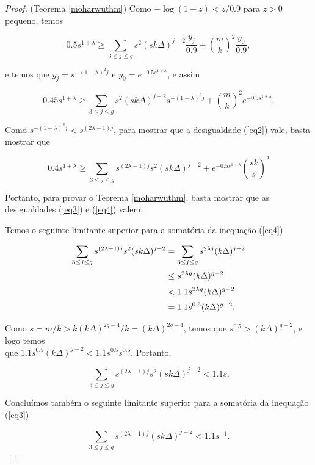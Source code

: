 \begin{proof}{(Teorema \ref{moharwuthm})}
Como $-\log(1-z) < z/0.9$ para $z>0$ pequeno, temos

\[0.5s^{1+\lambda} \geq \sum_{3\leq j \leq g} s^2(sk\Delta)^{j-2}\frac{y_j}{0.9} + \binom{m}{k}^2\frac{y_0}{0.9},\]

e temos que $y_j = s^{-(1-\lambda)^2j}$ e $y_0 = e^{-0.5s^{1+\lambda}}$, e assim

\[0.45s^{1+\lambda} \geq \sum_{3\leq j \leq g} s^2(sk\Delta)^{j-2} s^{-(1-\lambda)^2j} + \binom{m}{k}^2e^{-0.5s^{1+\lambda}}.\]

Como $s^{-(1-\lambda)^2j} < s^{(2\lambda - 1)j}$, para mostrar que a desigualdade (\ref{eq2}) vale, basta mostrar que

\begin{equation}\label{eq4}
0.4s^{1+\lambda} \geq \sum_{3\leq j\leq g}s^{(2\lambda-1)j}s^2(sk\Delta)^{j-2}+e^{-0.5s^{1+\lambda}}\binom{sk}{s}^2
\end{equation}

Portanto, para provar o Teorema \ref{moharwuthm}, basta mostrar que as desigualdades (\ref{eq3}) e (\ref{eq4}) valem.

Temos o seguinte limitante superior para a somatória da inequação (\ref{eq4})

\begin{equation*}
\setlength{\jot}{5pt}
\begin{aligned}
\sum_{3\leq j\leq g}s^{(2\lambda-1)j}s^2(sk\Delta)^{j-2} & = \sum_{3\leq j\leq g}s^{2\lambda j}(k\Delta)^{j-2} \\
 & \leq s^{2\lambda g}(k\Delta)^{g-2} \\
 & < 1.1s^{2\lambda g}(k\Delta)^{g-2} \\
 & = 1.1s^{0.5}(k\Delta)^{g-2}.
\end{aligned}
\end{equation*}

Como $s = m/k > k(k\Delta)^{2g-4}/k = (k\Delta)^{2g-4}$, temos que $s^{0.5} > (k\Delta)^{g-2}$, e logo temos \\que $1.1s^{0.5}(k\Delta)^{g-2} < 1.1s^{0.5}s^{0.5}$. Portanto,

\begin{equation*}
\sum_{3\leq j\leq g}s^{(2\lambda-1)j}s^2(sk\Delta)^{j-2} < 1.1s.
\end{equation*}

Concluímos também o seguinte limitante superior para a somatória da inequação (\ref{eq3})

\begin{equation*}
\sum_{3\leq j\leq g}s^{(2\lambda-1)j}(sk\Delta)^{j-2} < 1.1s^{-1}.
\end{equation*}


\end{proof}
